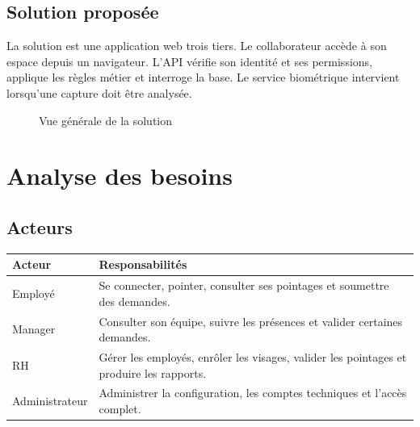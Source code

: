\documentclass[11pt,a4paper,oneside]{report}
\begin{document}
\section{Solution proposée}
La solution est une application web trois tiers. Le collaborateur accède à son espace depuis un navigateur. L'API vérifie son identité et ses permissions, applique les règles métier et interroge la base. Le service biométrique intervient lorsqu'une capture doit être analysée.
\begin{figure}[H]
\centering
{}
\caption{Vue générale de la solution}
\end{figure}

\chapter{Analyse des besoins}
\section{Acteurs}
\begin{longtable}{p{3.5cm}p{10cm}}
\toprule\textbf{Acteur} & \textbf{Responsabilités}\\\midrule
Employé & Se connecter, pointer, consulter ses pointages et soumettre des demandes.\\
Manager & Consulter son équipe, suivre les présences et valider certaines demandes.\\
RH & Gérer les employés, enrôler les visages, valider les pointages et produire les rapports.\\
Administrateur & Administrer la configuration, les comptes techniques et l'accès complet.\\
\bottomrule
\end{longtable}
\end{document}

